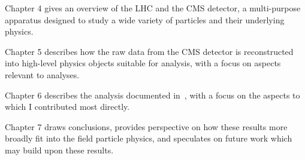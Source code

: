 Chapter 4 gives an overview of the LHC and the CMS detector, a multi-purpose apparatus designed to study a wide variety of particles and their underlying physics.

Chapter 5 describes how the raw data from the CMS detector is reconstructed into high-level physics objects suitable for analysis, with a focus on aspects relevant to \Hgg analyses.

Chapter 6 describes the \ttH analysis documented in~\cite{tth_observation}, with a focus on the aspects to which I contributed most directly.

Chapter 7 draws conclusions, provides perspective on how these results more broadly fit into the field particle physics, and speculates on future work which may build upon these results. 



